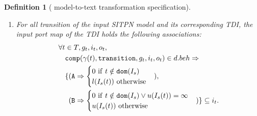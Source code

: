 \documentclass[pdflatex,sn-mathphys]{sn-jnl}%
\theoremstyle{thmstyleone}%
\theoremstyle{thmstyletwo}%
\theoremstyle{thmstylethree}%
\newtheorem{definition}{Definition}%
\begin{document}
\begin{definition}[\hilecop{} model-to-text transformation specification]
\begin{enumerate}[resume]
\begin{equation*}
\begin{aligned}[t]
\begin{aligned}[t]
\begin{cases}
                      \end{cases})\}. \\
                    \end{aligned} \\
      \end{aligned}
    \end{equation*}
    where
    \texttt{input}$(t)=\{p~\vert~pre(p,t)=\lfloor(\omega,a)\rfloor\}$,
    the set of input places of transition $t$, and
    \texttt{conds}$(t)=\{c~\vert~\mathbb{C}(t,c)=1\lor\mathbb{C}(t,c)=-1\}$,
    the set of conditions associated with transition $t$.
    
  \item\label{it:tdi-time-itval} For all transition of the input SITPN
    model and its corresponding TDI, the input port map of the TDI
    holds the following associations:
    \begin{equation*}
      \begin{aligned}[t]
        \forall{}t&\in{}T,g_t,i_t,o_t, \\
                  & \mathtt{comp}(\gamma(t),\mathtt{transition},g_t,i_t,o_t)\in{}d.beh\Rightarrow \\
                  &
                    \begin{aligned}[t]
                      \{&(\mathtt{A}\Rightarrow\begin{cases}
                                                0~\mathrm{if}~t\notin\mathtt{dom}(I_s) \\
                                                l(I_s(t))~\mathrm{otherwise} \\
                                              \end{cases}), \\
                      & (\mathtt{B}\Rightarrow\begin{cases}
                                              0~\mathrm{if}~t\notin\mathtt{dom}(I_s)\lor{}u(I_s(t))=\infty \\
                                              u(I_s(t))~\mathrm{otherwise} \\
                                            \end{cases})\}\subseteq{}i_t. \\
                    \end{aligned}
        \\
      \end{aligned}
    \end{equation*}

  \end{enumerate}


\end{definition}
\end{document}
